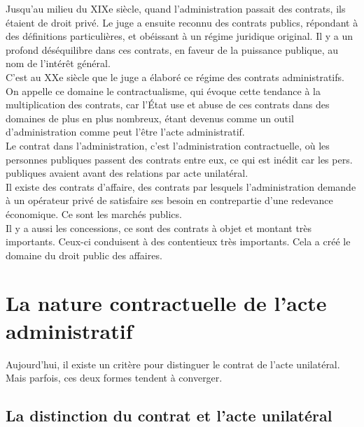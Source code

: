 \documentclass[10pt, a4paper, openany]{book}
\begin{document}
Jusqu'au milieu du XIXe siècle, quand l'administration passait des contrats, ils étaient de droit privé. Le juge a ensuite reconnu des contrats publics, répondant à des définitions particulières, et obéissant à un régime juridique original. Il y a un profond déséquilibre dans ces contrats, en faveur de la puissance publique, au nom de l'intérêt général. \\
C'est au XXe siècle que le juge a élaboré ce régime des contrats administratifs. On appelle ce domaine le contractualisme, qui évoque cette tendance à la multiplication des contrats, car l'État use et abuse de ces contrats dans des domaines de plus en plus nombreux, étant devenus comme un outil d'administration comme peut l'être l'acte administratif. \\
Le contrat dans l'administration, c'est l'administration contractuelle, où les personnes publiques passent des contrats entre eux, ce qui est inédit car les pers. publiques avaient avant des relations par acte unilatéral. \\
Il existe des contrats d'affaire, des contrats par lesquels l'administration demande à un opérateur privé de satisfaire ses besoin en contrepartie d'une redevance économique. Ce sont les marchés publics. \\
Il y a aussi les concessions, ce sont des contrats à objet et montant très importants. Ceux-ci conduisent à des contentieux très importants. Cela a créé le domaine du droit public des affaires. 

\section{La nature contractuelle de l'acte administratif}

Aujourd'hui, il existe un critère pour distinguer le contrat de l'acte unilatéral. Mais parfois, ces deux formes tendent à converger. 

\subsection{La distinction du contrat et l'acte unilatéral}
\end{document}

